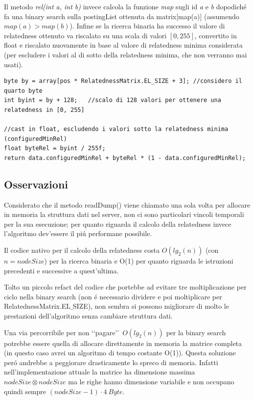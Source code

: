 Il metodo \textit{rel(int a, int b)} invece calcola la funzione \textit{map} sugli id \textit{a} e \textit{b} dopodich\'e fa una binary search sulla postingList 
ottenuta da matrix[map(a)] (assumendo $map(a) > map(b)$). Infine se la ricerca binaria ha successo il valore di relatedness ottenuto va riscalato su una scala di valori 
$[0, 255]$, convertito in float e riscalato nuovamente in base al valore di relatedness minima considerata (per escludere i valori al di sotto della relatedness minima,
che non verranno mai usati).  

\begin{lstlisting}[style=JavaStyle]
byte by = array[pos * RelatednessMatrix.EL_SIZE + 3]; //considero il quarto byte 
int byint = by + 128;   //scalo di 128 valori per ottenere una relatedness in [0, 255]

//cast in float, escludendo i valori sotto la relatedness minima (configuredMinRel)
float byteRel = byint / 255f; 
return data.configuredMinRel + byteRel * (1 - data.configuredMinRel);
\end{lstlisting}

\subsection{Osservazioni}
Considerato che il metodo readDump() viene chiamato una sola volta per allocare in memoria la struttura dati nel server, 
non ci sono particolari vincoli temporali per la sua esecuzione; per quanto riguarda il calcolo della relatedness invece 
l'algoritmo dev'essere il pi\'u performane possibile.

Il codice nativo per il calcolo della relatedness costa $O(lg_2(n))$ (con $n=nodeSize$) per la ricerca binaria e O(1) per quanto riguarda le 
istruzioni precedenti e successive a quest'ultima.

Tolto un piccolo refact del codice che portebbe ad evitare tre moltiplicazione per ciclo nella binary search (non \'e necessario dividere e poi moltiplicare per 
RelatednessMatrix.EL$\_$SIZE), non sembra si possono migliorare di molto le prestazioni dell'algoritmo senza cambiare struttura dati.

Una via percorribile per non \lq\lq pagare\rq\rq\ $O(lg_2(n))$ per la binary search potrebbe essere quella di allocare direttamente in memoria la matrice 
completa (in questo caso avrei un algoritmo di tempo costante O(1)). Questa soluzione per\'o andrebbe a peggiorare drasticamente lo spreco di memoria.
Infatti nell'implementazione attuale la matrice ha dimensione massima $nodeSize \otimes nodeSize$ ma le righe hanno dimensione variabile e 
non occupano quindi sempre $(nodeSize -1) \cdot 4\ Byte$.

